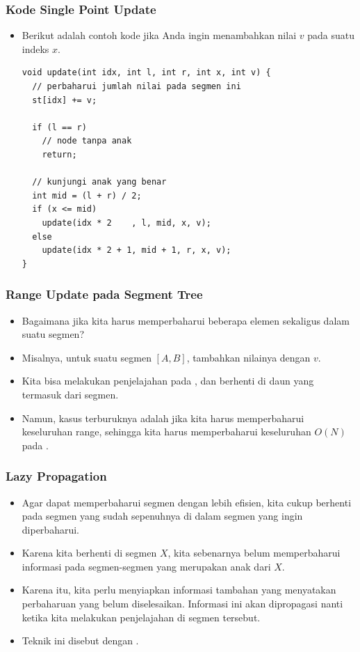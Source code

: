 \begin{frame}[fragile]
\frametitle{Kode Single Point Update}
\begin{itemize}
  \item Berikut adalah contoh kode jika Anda ingin menambahkan nilai $v$ pada suatu indeks $x$.
  \begin{lstlisting}
void update(int idx, int l, int r, int x, int v) {
  // perbaharui jumlah nilai pada segmen ini
  st[idx] += v;     

  if (l == r) 
    // node tanpa anak
    return;

  // kunjungi anak yang benar
  int mid = (l + r) / 2;
  if (x <= mid) 
    update(idx * 2    , l, mid, x, v);
  else 
    update(idx * 2 + 1, mid + 1, r, x, v);
}
\end{lstlisting}
\end{itemize}
\end{frame}

\begin{frame}
\frametitle{Range Update pada Segment Tree}
\begin{itemize}
  \item Bagaimana jika kita harus memperbaharui beberapa elemen sekaligus dalam suatu segmen?
  \item Misalnya, untuk suatu segmen $[A,B]$, tambahkan nilainya dengan $v$.
  \item Kita bisa melakukan penjelajahan pada \fsegmentTree, dan berhenti di daun yang termasuk dari segmen.
  \item Namun, kasus terburuknya adalah jika kita harus memperbaharui keseluruhan range, sehingga kita harus memperbaharui keseluruhan $O(N)$ \fnode pada \fsegmentTree.
\end{itemize}
\end{frame}

\begin{frame}
\frametitle{Lazy Propagation}
\begin{itemize}
  \item Agar dapat memperbaharui segmen dengan lebih efisien, kita cukup berhenti pada segmen yang sudah sepenuhnya di dalam segmen yang ingin diperbaharui.
  \item Karena kita berhenti di segmen $X$, kita sebenarnya belum memperbaharui informasi pada segmen-segmen yang merupakan anak dari $X$.
  \item Karena itu, kita perlu menyiapkan informasi tambahan yang menyatakan perbaharuan yang belum diselesaikan. Informasi ini akan dipropagasi nanti ketika kita melakukan penjelajahan di segmen tersebut.
  \item Teknik ini disebut dengan .
\end{itemize}
\end{frame}

